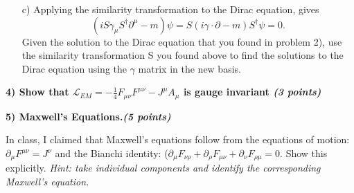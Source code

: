 {\begin{itemize}
\item[c)]
 Applying the similarity transformation to the Dirac equation, gives 
\begin{equation*}
(i S \gamma_\mu S^\dagger \partial^{\mu} - m)\psi = S(i\gamma \cdot \partial - m)S^\dagger\psi = 0.
\end{equation*}
Given the solution to the Dirac equation that you found in problem 2), use the similarity transformation S you found above to find the solutions to the Dirac equation using the $\gamma$ matrix in the new basis.
\end{itemize}

\vspace*{0.25in}

\textbf{4) Show that  $\mathscr{L}_{EM} = -\frac{1}{4}F_{\mu\nu}F^{\mu\nu} - J^{\mu}A_{\mu}$ is gauge invariant \hfill \textit{(3 points)}}


\vspace*{0.25in}




\textbf{5) Maxwell’s Equations.\hfill \textit{(5 points)}}

In class,  I claimed that Maxwell’s equations follow from the equations of motion:  $\partial_\mu F^{\mu\nu} = J^\nu$ and the Bianchi identity: ($\partial_\mu F_{\nu\rho} +\partial_\rho F_{\mu\nu} +\partial_\nu F_{\rho\mu} =0$.
Show this explicitly.
\textit{Hint: take individual components and identify the corresponding Maxwell’s equation.
}


}






